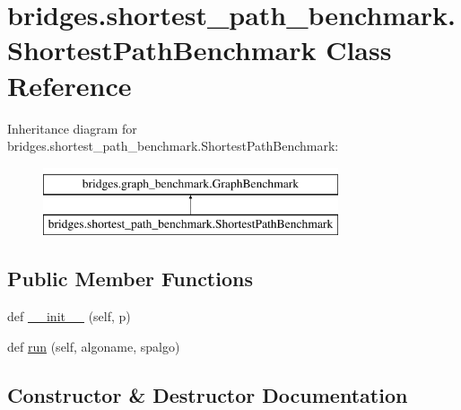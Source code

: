 \hypertarget{classbridges_1_1shortest__path__benchmark_1_1_shortest_path_benchmark}{}\section{bridges.\+shortest\+\_\+path\+\_\+benchmark.\+Shortest\+Path\+Benchmark Class Reference}
\label{classbridges_1_1shortest__path__benchmark_1_1_shortest_path_benchmark}
Inheritance diagram for bridges.\+shortest\+\_\+path\+\_\+benchmark.\+Shortest\+Path\+Benchmark\+:\begin{figure}[H]
\begin{center}
\leavevmode
\includegraphics[height=2.000000cm]{classbridges_1_1shortest__path__benchmark_1_1_shortest_path_benchmark}
\end{center}
\end{figure}
\subsection*{Public Member Functions}
\begin{DoxyCompactItemize}
\item 
def \hyperlink{classbridges_1_1shortest__path__benchmark_1_1_shortest_path_benchmark_a708778696f57647d5f8bf94e37297362}{\+\_\+\+\_\+init\+\_\+\+\_\+} (self, p)
\item 
def \hyperlink{classbridges_1_1shortest__path__benchmark_1_1_shortest_path_benchmark_aba41366eff6ee3281ba4decd8d57b089}{run} (self, algoname, spalgo)
\end{DoxyCompactItemize}


\subsection{Constructor \& Destructor Documentation}
\mbox{\label{classbridges_1_1shortest__path__benchmark_1_1_shortest_path_benchmark_a708778696f57647d5f8bf94e37297362}} 
